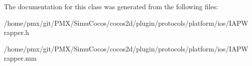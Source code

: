 The documentation for this class was generated from the following files\+:\begin{DoxyCompactItemize}
\item 
/home/pmx/git/\+P\+M\+X/\+Simu\+Cocos/cocos2d/plugin/protocols/platform/ios/I\+A\+P\+Wrapper.\+h\item 
/home/pmx/git/\+P\+M\+X/\+Simu\+Cocos/cocos2d/plugin/protocols/platform/ios/I\+A\+P\+Wrapper.\+mm\end{DoxyCompactItemize}
